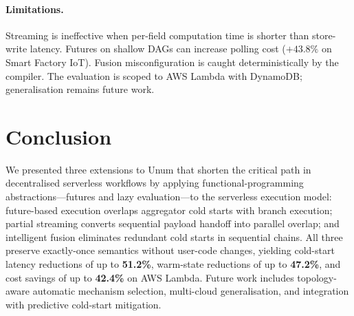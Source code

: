 \documentclass[runningheads]{llncs}
\begin{document}
\paragraph{Limitations.}
Streaming is ineffective when per-field computation time is shorter than store-write latency. Futures on shallow DAGs can increase polling cost ($+43.8\%$ on Smart Factory IoT). Fusion misconfiguration is caught deterministically by the compiler. The evaluation is scoped to AWS Lambda with DynamoDB; generalisation remains future work.




\section{Conclusion}
\label{sec:conclusion}

We presented three extensions to Unum that shorten the critical path in decentralised serverless workflows by applying functional-programming abstractions---futures and lazy evaluation---to the serverless execution model: future-based execution overlaps aggregator cold starts with branch execution; partial streaming converts sequential payload handoff into parallel overlap; and intelligent fusion eliminates redundant cold starts in sequential chains. All three preserve exactly-once semantics without user-code changes, yielding cold-start latency reductions of up to \textbf{51.2\%}, warm-state reductions of up to \textbf{47.2\%}, and cost savings of up to \textbf{42.4\%} on AWS Lambda. Future work includes topology-aware automatic mechanism selection, multi-cloud generalisation, and integration with predictive cold-start mitigation.

%
%
%


%
\end{document}
